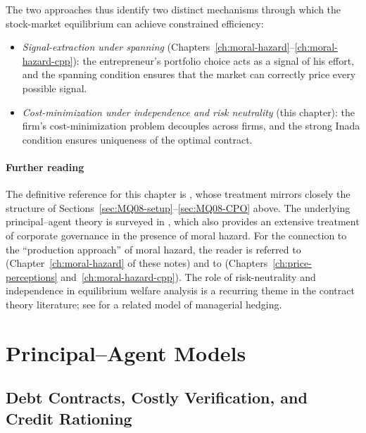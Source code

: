 \documentclass[11pt,a4paper,oneside]{book}
\theoremstyle{plain}
\theoremstyle{definition}
\theoremstyle{remark}
\numberwithin{equation}{chapter}
\begin{document}
The two approaches thus identify two distinct mechanisms through which the stock-market equilibrium can achieve constrained efficiency:
\begin{itemize}
  \item \emph{Signal-extraction under spanning} (Chapters~\ref{ch:moral-hazard}--\ref{ch:moral-hazard-cpp}): the entrepreneur's portfolio choice acts as a signal of his effort, and the spanning condition ensures that the market can correctly price every possible signal.
  \item \emph{Cost-minimization under independence and risk neutrality} (this chapter): the firm's cost-minimization problem decouples across firms, and the strong Inada condition ensures uniqueness of the optimal contract.
\end{itemize}

\subsection{Further reading}

The definitive reference for this chapter is \citet{MagillQuinzii2008}, whose treatment mirrors closely the structure of Sections~\ref{sec:MQ08-setup}--\ref{sec:MQ08-CPO} above.
The underlying principal--agent theory is surveyed in \citet{Tirole2006}, which also provides an extensive treatment of corporate governance in the presence of moral hazard.
For the connection to the ``production approach'' of moral hazard, the reader is referred to \citet{MagillQuinzii2002} (Chapter~\ref{ch:moral-hazard} of these notes) and to \citet{BisinGottardiRuta2014} (Chapters~\ref{ch:price-perceptions} and~\ref{ch:moral-hazard-cpp}).
The role of risk-neutrality and independence in equilibrium welfare analysis is a recurring theme in the contract theory literature; see \citet{BisinGottardiRampini2008} for a related model of managerial hedging.


\part{Principal--Agent Models}


\chapter{Debt Contracts, Costly Verification, and Credit Rationing}
\label{ch:debt-rationing}
\end{document}

